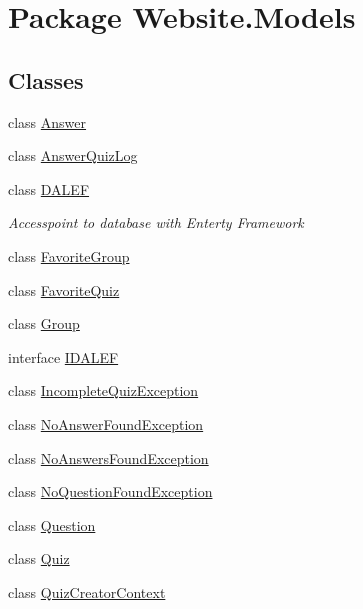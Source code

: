 \hypertarget{namespace_website_1_1_models}{}\section{Package Website.\+Models}
\label{namespace_website_1_1_models}
\subsection*{Classes}
\begin{DoxyCompactItemize}
\item 
class \hyperlink{class_website_1_1_models_1_1_answer}{Answer}
\item 
class \hyperlink{class_website_1_1_models_1_1_answer_quiz_log}{Answer\+Quiz\+Log}
\item 
class \hyperlink{class_website_1_1_models_1_1_d_a_l_e_f}{D\+A\+L\+E\+F}
\begin{DoxyCompactList}\small\item\em Accesspoint to database with Enterty Framework \end{DoxyCompactList}\item 
class \hyperlink{class_website_1_1_models_1_1_favorite_group}{Favorite\+Group}
\item 
class \hyperlink{class_website_1_1_models_1_1_favorite_quiz}{Favorite\+Quiz}
\item 
class \hyperlink{class_website_1_1_models_1_1_group}{Group}
\item 
interface \hyperlink{interface_website_1_1_models_1_1_i_d_a_l_e_f}{I\+D\+A\+L\+E\+F}
\item 
class \hyperlink{class_website_1_1_models_1_1_incomplete_quiz_exception}{Incomplete\+Quiz\+Exception}
\item 
class \hyperlink{class_website_1_1_models_1_1_no_answer_found_exception}{No\+Answer\+Found\+Exception}
\item 
class \hyperlink{class_website_1_1_models_1_1_no_answers_found_exception}{No\+Answers\+Found\+Exception}
\item 
class \hyperlink{class_website_1_1_models_1_1_no_question_found_exception}{No\+Question\+Found\+Exception}
\item 
class \hyperlink{class_website_1_1_models_1_1_question}{Question}
\item 
class \hyperlink{class_website_1_1_models_1_1_quiz}{Quiz}
\item 
class \hyperlink{class_website_1_1_models_1_1_quiz_creator_context}{Quiz\+Creator\+Context}

\end{DoxyCompactItemize}
